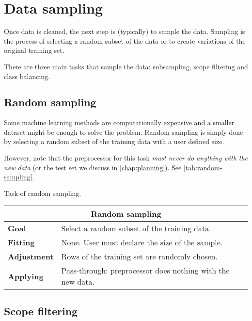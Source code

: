 \section{Data sampling}

Once data is cleaned, the next step is (typically) to sample the data.  Sampling is the
process of selecting a random subset of the data or to create variations of the original
training set.

There are three main tasks that sample the data: subsampling, scope filtering and class
balancing.

\subsection{Random sampling}
\label{sub:random-sampling}

Some machine learning methods are computationally expensive and a smaller dataset might be
enough to solve the problem.  Random sampling is simply done by selecting a random subset
of the training data with a user defined size.

However, note that the preprocessor for this task \emph{must never do anything with the
new data} (or the test set we discuss in \cref{chap:planning}).  See
\cref{tab:random-sampling}.

\begin{tablebox}[label=tab:random-sampling]{Task of random sampling.}
  \centering
  \begin{tabular}{lp{6cm}}
    \toprule
    \multicolumn{2}{c}{\textbf{Random sampling}} \\
    \midrule
    \textbf{Goal} &
      Select a random subset of the training data. \\
    \textbf{Fitting} &
      None. User must declare the size of the sample. \\
    \textbf{Adjustment} &
      Rows of the training set are randomly chosen. \\
    \textbf{Applying} &
      Pass-through: preprocessor does nothing with the new data. \\
    \bottomrule
  \end{tabular}
\end{tablebox}

\subsection{Scope filtering}

